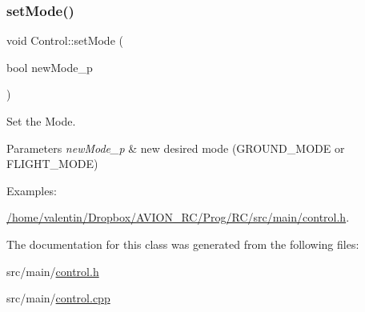 \subsubsection{\texorpdfstring{set\+Mode()}{setMode()}}
{\footnotesize\ttfamily void Control\+::set\+Mode (\begin{DoxyParamCaption}\item[{bool}]{new\+Mode\+\_\+p }\end{DoxyParamCaption})}



Set the Mode. 


\begin{DoxyParams}{Parameters}
{\em new\+Mode\+\_\+p} & new desired mode (G\+R\+O\+U\+N\+D\+\_\+\+M\+O\+DE or F\+L\+I\+G\+H\+T\+\_\+\+M\+O\+DE) \\
\hline
\end{DoxyParams}
\begin{Desc}
\item[Examples\+: ]\par
\hyperlink{_2home_2valentin_2_dropbox_2_a_v_i_o_n__r_c_2_prog_2_r_c_2src_2main_2control_8h-example}{/home/valentin/\+Dropbox/\+A\+V\+I\+O\+N\+\_\+\+R\+C/\+Prog/\+R\+C/src/main/control.\+h}.\end{Desc}


The documentation for this class was generated from the following files\+:\begin{DoxyCompactItemize}
\item 
src/main/\hyperlink{control_8h}{control.\+h}\item 
src/main/\hyperlink{control_8cpp}{control.\+cpp}\end{DoxyCompactItemize}
